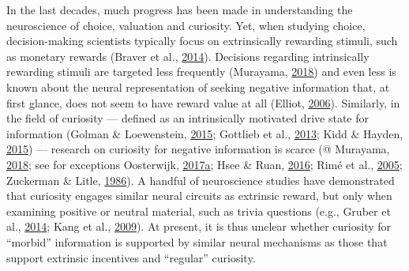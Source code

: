 \documentclass[11pt,american,a4paper,oneside,]{memoir} %
\begin{document}
In the last decades, much progress has been made in understanding the neuroscience of choice, valuation and curiosity. Yet, when studying choice, decision-making scientists typically focus on extrinsically rewarding stimuli, such as monetary rewards (Braver et al., \protect\hyperlink{ref-braver2014mechanisms}{2014}). Decisions regarding intrinsically rewarding stimuli are targeted less frequently (Murayama, \protect\hyperlink{ref-murayama2018psychological}{2018}) and even less is known about the neural representation of seeking negative information that, at first glance, does not seem to have reward value at all (Elliot, \protect\hyperlink{ref-elliot2006hierarchical}{2006}). Similarly, in the field of curiosity --- defined as an intrinsically motivated drive state for information (Golman \& Loewenstein, \protect\hyperlink{ref-golman2015curiosity}{2015}; Gottlieb et al., \protect\hyperlink{ref-gottlieb2013information}{2013}; Kidd \& Hayden, \protect\hyperlink{ref-kidd2015psychology}{2015}) --- research on curiosity for negative information is scarce (@ Murayama, \protect\hyperlink{ref-murayama2018psychological}{2018}; see for exceptions Oosterwijk, \protect\hyperlink{ref-oosterwijk2017choosing}{2017}\protect\hyperlink{ref-oosterwijk2017choosing}{a}; Hsee \& Ruan, \protect\hyperlink{ref-hsee2016pandora}{2016}; Rimé et al., \protect\hyperlink{ref-rime2005brief}{2005}; Zuckerman \& Litle, \protect\hyperlink{ref-zuckerman1986personality}{1986}). A handful of neuroscience studies have demonstrated that curiosity engages similar neural circuits as extrinsic reward, but only when examining positive or neutral material, such as trivia questions (e.g., Gruber et al., \protect\hyperlink{ref-gruber2014states}{2014}; Kang et al., \protect\hyperlink{ref-kang2009wick}{2009}). At present, it is thus unclear whether curiosity for ``morbid'' information is supported by similar neural mechanisms as those that support extrinsic incentives and ``regular'' curiosity.
\end{document}
